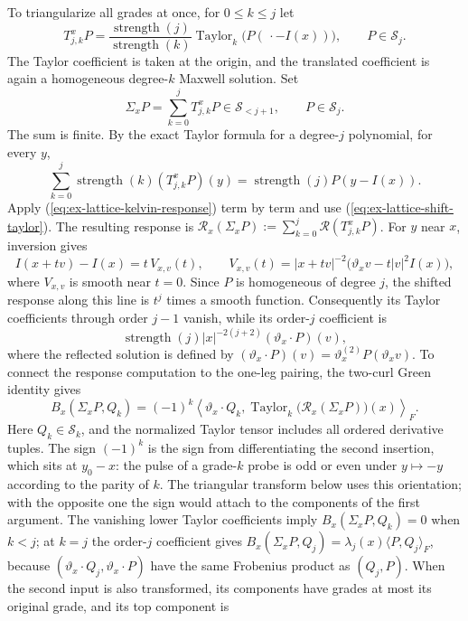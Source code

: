 To triangularize all grades at once, for $0\leq k\leq j$ let
\[
 T_{j,k}^{x}P
 =\frac{\operatorname{strength}(j)}{\operatorname{strength}(k)}
   \operatorname{Taylor}_{k}\bigl(P(\,\cdot-I(x))\bigr),
 \qquad P\in\mathscr S_j.
\]
The Taylor coefficient is taken at the origin, and the translated
coefficient is again a homogeneous degree-$k$ Maxwell solution. Set
\[
 \Sigma_xP=\sum_{k=0}^{j} T_{j,k}^{x}P\in\mathscr S_{<j+1},
 \qquad P\in\mathscr S_j.
\]
The sum is finite. By the exact Taylor formula for a degree-$j$ polynomial,
for every $y$,
\begin{equation}\label{eq:ex-lattice-shift-taylor}
 \sum_{k=0}^{j}\operatorname{strength}(k)
   (T_{j,k}^{x}P)(y)
 =\operatorname{strength}(j)P(y-I(x)).
\end{equation}
Apply (\ref{eq:ex-lattice-kelvin-response}) term by term and use
(\ref{eq:ex-lattice-shift-taylor}). The resulting response is
$\mathcal R_x(\Sigma_xP):=\sum_{k=0}^j\mathcal R(T_{j,k}^{x}P)$.
For $y$ near $x$, inversion gives
\[
I(x+t v)-I(x)=t\,V_{x,v}(t),\qquad
V_{x,v}(t)=|x+t v|^{-2}
  \bigl(\vartheta_xv-t|v|^2I(x)\bigr),
\]
where $V_{x,v}$ is smooth near $t=0$. Since $P$ is homogeneous of degree
$j$, the shifted response along this line is $t^j$ times a smooth function.
Consequently its Taylor coefficients through order $j-1$ vanish, while
its order-$j$ coefficient is
\[
 \operatorname{strength}(j)|x|^{-2(j+2)}
  (\vartheta_x\cdot P)(v),
\]
where the reflected solution is defined by
$(\vartheta_x\cdot P)(v)=\vartheta_x^{(2)}P(\vartheta_xv)$.
To connect the response computation to the one-leg pairing, the
two-curl Green identity gives
\[
 B_x(\Sigma_xP,Q_k)=(-1)^k
 \left\langle \vartheta_x\cdot Q_k,
   \operatorname{Taylor}_{k}\bigl(\mathcal R_x(\Sigma_xP)\bigr)(x)\right\rangle_F.
\]
Here $Q_k\in\mathscr S_k$, and the normalized Taylor tensor includes all
ordered derivative tuples. The sign $(-1)^k$ is the sign from
differentiating the second insertion, which sits at $y_0-x$: the pulse of a
grade-$k$ probe is odd or even under $y\mapsto-y$ according to the parity of
$k$.  The triangular transform below uses this orientation; with the
opposite one the sign would attach to the components of the first argument. The vanishing lower Taylor
coefficients imply $B_x(\Sigma_xP,Q_k)=0$ when $k<j$; at $k=j$ the
order-$j$ coefficient gives
$B_x(\Sigma_xP,Q_j)=\lambda_j(x)\langle P,Q_j\rangle_F$, because
$(\vartheta_x\cdot Q_j,\vartheta_x\cdot P)$ have the same Frobenius
product as $(Q_j,P)$. When the second input is also transformed, its
components have grades at most its original grade, and its top component is
